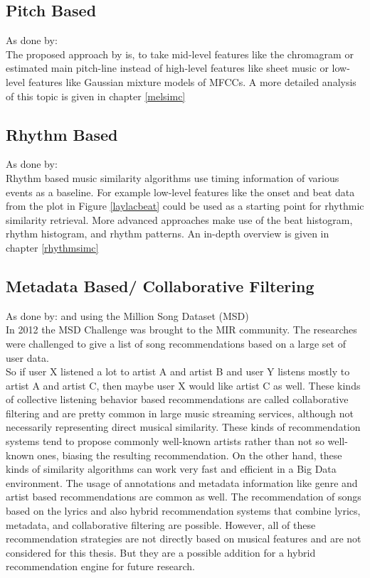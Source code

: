 \subsection{Pitch Based}

As done by: \cite{pitch1}\\
The proposed approach by \cite{pitch1} is, to take mid-level features like the chromagram or estimated main pitch-line instead of high-level features like sheet music or low-level features like Gaussian mixture models of MFCCs. 
A more detailed analysis of this topic is given in chapter \ref{melsimc}

\subsection{Rhythm Based}

As done by: \cite{rhythm1}\\
Rhythm based music similarity algorithms use timing information of various events as a baseline. 
For example low-level features like the onset and beat data from the plot in Figure \ref{laylacbeat} could be used as a starting point for rhythmic similarity retrieval. More advanced approaches make use of the beat histogram, rhythm histogram, and rhythm patterns. 
An in-depth overview is given in chapter \ref{rhythmsimc}

\subsection{Metadata Based/ Collaborative Filtering}\label{collaborative}

As done by: \cite{metadat1} and \cite{msd4} using the Million Song Dataset (MSD) \cite{msd1}\\
In 2012 the MSD Challenge was brought to the MIR community. The researches were challenged to give a list of song recommendations based on a large set of user data.\\ 
So if user X listened a lot to artist A and artist B and user Y listens mostly to artist A and artist C, then maybe user X would like artist C as well. 
These kinds of collective listening behavior based recommendations are called collaborative filtering \cite[p. 192f.]{knees1} and are pretty common in large music streaming services, although not necessarily representing direct musical similarity.
These kinds of recommendation systems tend to propose commonly well-known artists rather than not so well-known ones, biasing the resulting recommendation. On the other hand, these kinds of similarity algorithms can work very fast and efficient in a Big Data environment.
The usage of annotations and metadata information like genre and artist based recommendations are common as well. The recommendation of songs based on the lyrics and also hybrid recommendation systems that combine lyrics, metadata, and collaborative filtering are possible. 
However, all of these recommendation strategies are not directly based on musical features and are not considered for this thesis. But they are a possible addition for a hybrid recommendation engine for future research. 

